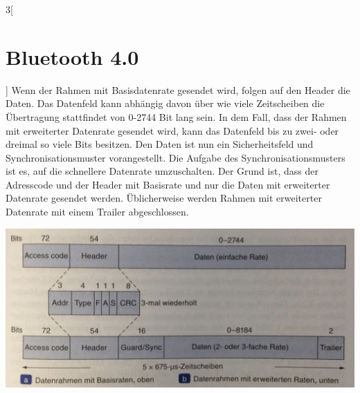 \begin{multicols}{3}[\section{Bluetooth 4.0}]
Wenn der Rahmen mit Basisdatenrate gesendet wird, folgen auf den Header die Daten. Das Datenfeld kann abhängig davon über wie viele Zeitscheiben die Übertragung stattfindet von 0-2744 Bit lang sein. In dem Fall, dass der Rahmen mit erweiterter Datenrate gesendet wird, kann das Datenfeld bis zu zwei- oder dreimal so viele Bits besitzen. Den Daten ist nun ein Sicherheitsfeld und Synchronisationsmuster vorangestellt. Die Aufgabe des Synchronisationsmusters ist es, auf die schnellere Datenrate umzuschalten. Der Grund ist, dass der Adresscode und der Header mit Basisrate und nur die Daten mit erweiterter Datenrate gesendet werden. Üblicherweise werden Rahmen mit erweiterter Datenrate mit einem Trailer abgeschlossen.\cite{Bluetooth_4.2}

\begin{Figure}
\includegraphics[width=\linewidth]{Kapitel/Bluetooth_4/Grafiken/rahmenstruktur.jpg}
\label{fig:vorlage.vorlesungssaal}
\end{Figure}

\end{multicols}
\newpage
